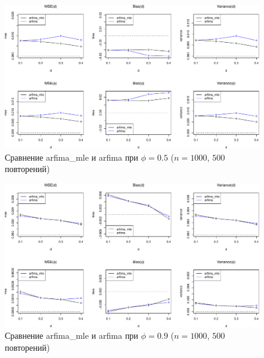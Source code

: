 \documentclass[specialist,
substylefile = spbu_report.rtx,
subf,href,colorlinks=true, 12pt]{disser}
\theoremstyle{definition}
\begin{document}
\begin{figure}[h]
	\centering
	\includegraphics[width=\textwidth]{img/arfi_est_phi5.pdf}
	\caption{Сравнение \textsf{arfima\_mle} и \textsf{arfima} при $\phi=0.5$ ($n=1000$, $500$ повторений)}
	\label{fig:mle_comparison_phi5}
\end{figure}

\begin{figure}[h]
	\centering
	\includegraphics[width=\textwidth]{img/arfi_est_phi9.pdf}
	\caption{Сравнение \textsf{arfima\_mle} и \textsf{arfima} при $\phi=0.9$ ($n=1000$, $500$ повторений)}
	\label{fig:mle_comparison_phi9}
\end{figure}
\end{document}
